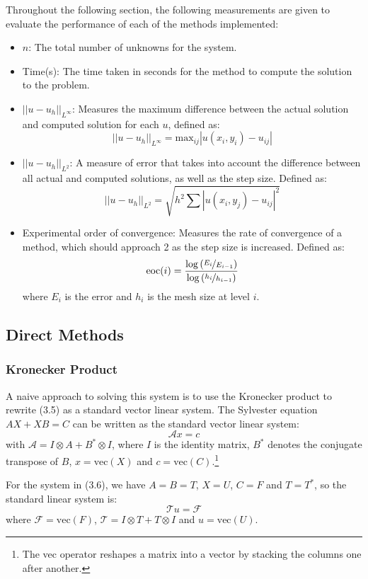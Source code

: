 \documentclass{article}
\numberwithin{equation}{section}
\begin{document}
Throughout the following section, the following measurements are given to evaluate the performance of each of the methods implemented:
\begin{itemize}
\item $n$: The total number of unknowns for the system.
\item Time(s): The time taken in seconds for the method to compute the solution to the problem.
\item $|| u - u_h ||_{L^\infty} $: Measures the maximum difference between the actual solution and computed solution for each $u$, defined as:
 \[ || u - u_h ||_{L^\infty} = \text{max}_{ij} | u(x_i, y_i) - u_{ij} | \]
\item $|| u - u_h ||_{L^2} $: A measure of error that takes into account the difference between all actual and computed solutions, as well as the step size. Defined as:
\[ || u - u_h ||_{L^2} = \sqrt{h^2 \sum | u(x_i,y_j) - u_{ij} |^2} \]
\item Experimental order of convergence: Measures the rate of convergence of a method, which should approach 2 as the step size is increased. Defined as:
\[ \text{eoc}(i) = \frac{\log{(\nicefrac{E_i}{E_{i-1}})}}{\log{(\nicefrac{h_i}{h_{i-1}})}} \]
where $E_i$ is the error and $h_i$ is the mesh size at level $i$. 
\end{itemize}

\subsection{Direct Methods}

\subsubsection{Kronecker Product}
A naive approach to solving this system is to use the Kronecker product to rewrite (3.5) as a standard vector linear system. The Sylvester equation $AX + XB = C$ can be written as the standard vector linear system:
\begin{equation}
\mathcal{A}x = c
\end{equation}
with $\mathcal{A} = I \otimes A + B^* \otimes I$, where $I$ is the identity matrix, $B^*$ denotes the conjugate transpose of $B$, $x = \text{vec}(X)$ and $c = \text{vec}(C)$.\footnote{The vec operator reshapes a matrix into a vector by stacking the columns one after another.}

For the system in (3.6), we have $A=B=T$, $X=U$, $C=F$ and $T=T^*$, so the standard linear system is:
\begin{equation}
\mathcal{T}u = \mathcal{F}
\end{equation}
where $\mathcal{F} = \text{vec}(F)$, $\mathcal{T} = I \otimes T + T \otimes I$ and $u = \text{vec}(U)$. 
\end{document}
